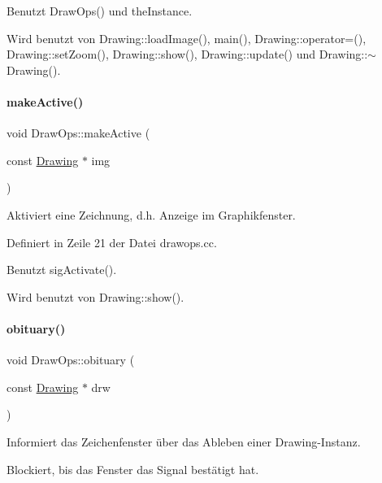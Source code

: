Benutzt Draw\+Ops() und the\+Instance.



Wird benutzt von Drawing\+::load\+Image(), main(), Drawing\+::operator=(), Drawing\+::set\+Zoom(), Drawing\+::show(), Drawing\+::update() und Drawing\+::$\sim$\+Drawing().

\mbox{\label{classDrawOps_a541a9b86fdabf35209d6fe1a7bccb8b8}} 
\paragraph{\texorpdfstring{make\+Active()}{makeActive()}}
{\footnotesize\ttfamily void Draw\+Ops\+::make\+Active (\begin{DoxyParamCaption}\item[{const \mbox{\hyperlink{classDrawing}{Drawing}} $\ast$}]{img }\end{DoxyParamCaption})}



Aktiviert eine Zeichnung, d.\+h. Anzeige im Graphikfenster. 



Definiert in Zeile 21 der Datei drawops.\+cc.



Benutzt sig\+Activate().



Wird benutzt von Drawing\+::show().

\mbox{\label{classDrawOps_a716f5c70f8b32a6e1a76437d5c3a346b}} 
\paragraph{\texorpdfstring{obituary()}{obituary()}}
{\footnotesize\ttfamily void Draw\+Ops\+::obituary (\begin{DoxyParamCaption}\item[{const \mbox{\hyperlink{classDrawing}{Drawing}} $\ast$}]{drw }\end{DoxyParamCaption})}



Informiert das Zeichenfenster über das Ableben einer Drawing-\/\+Instanz. 

Blockiert, bis das Fenster das Signal bestätigt hat. 

